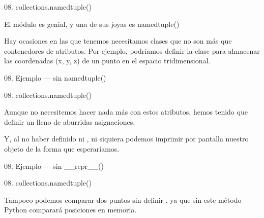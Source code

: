 
\begin{frame}{08. collections.namedtuple()}
  \begin{block}{}
    \Large
    \centering
    El módulo  es genial, y una de sus joyas es
    namedtuple()
  \end{block}

  \begin{center}
    \small
    Hay ocasiones en las que tenemos necesitamos clases que no son más
    que contenedores de atributos. Por ejemplo, podríamos definir la
    clase  para almacenar las coordenadas (x, y, z)
    de un punto en el espacio tridimensional.
  \end{center}
\end{frame}

\begin{frame}{08. Ejemplo — sin namedtuple()}
  \footnotesize
\end{frame}

\begin{frame}{08. collections.namedtuple()}
  \begin{alertblock}{}
    \centering
    Aunque no necesitemos hacer nada más con estos atributos, hemos
    tenido que definir un  lleno de
    aburridas asignaciones.
  \end{alertblock}

  \begin{center}
    Y, al no haber definido  ni
    , ni siquiera podemos imprimir por
    pantalla nuestro objeto de la forma que esperaríamos.
  \end{center}
\end{frame}

\begin{frame}{08. Ejemplo — sin \_\_repr\_\_()}
  \footnotesize
\end{frame}

\begin{frame}{08. collections.namedtuple()}
  \begin{alertblock}{}
    \large
    \centering
    Tampoco podemos comparar dos puntos sin definir
    , ya que sin este método Python comparará
    posiciones en memoria.
  \end{alertblock}
\end{frame}

